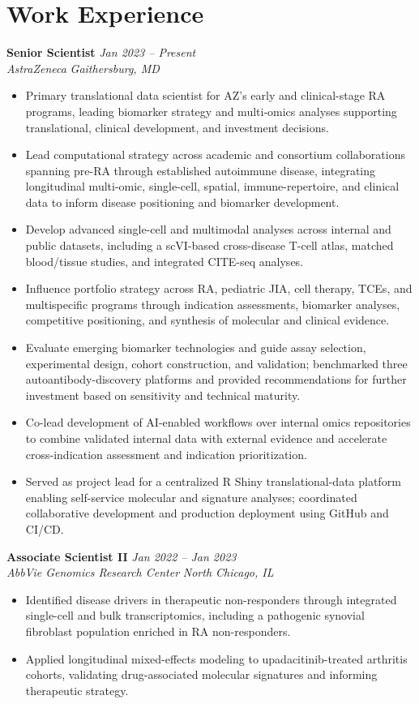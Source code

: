 \documentclass[letterpaper,11pt]{article}
\newcommand{\entry}[4]{%
    \textbf{#1} \hfill \textit{\color{graytext} #2} \\
    \textit{#3} \hfill \textit{\color{graytext} #4}\par
}
\begin{document}
\section*{Work Experience}
\entry{Senior Scientist}{Jan 2023 -- Present}{AstraZeneca}{Gaithersburg, MD}
\begin{itemize}
    \item Primary translational data scientist for AZ's early and clinical-stage RA programs, leading biomarker strategy and multi-omics analyses supporting translational, clinical development, and investment decisions.
    \item Lead computational strategy across academic and consortium collaborations spanning pre-RA through established autoimmune disease, integrating longitudinal multi-omic, single-cell, spatial, immune-repertoire, and clinical data to inform disease positioning and biomarker development.
    \item Develop advanced single-cell and multimodal analyses across internal and public datasets, including a scVI-based cross-disease T-cell atlas, matched blood/tissue studies, and integrated CITE-seq analyses.
    \item Influence portfolio strategy across RA, pediatric JIA, cell therapy, TCEs, and multispecific programs through indication assessments, biomarker analyses, competitive positioning, and synthesis of molecular and clinical evidence.
    \item Evaluate emerging biomarker technologies and guide assay selection, experimental design, cohort construction, and validation; benchmarked three autoantibody-discovery platforms and provided recommendations for further investment based on sensitivity and technical maturity.
    \item Co-lead development of AI-enabled workflows over internal omics repositories to combine validated internal data with external evidence and accelerate cross-indication assessment and indication prioritization.
    \item Served as project lead for a centralized R Shiny translational-data platform enabling self-service molecular and signature analyses; coordinated collaborative development and production deployment using GitHub and CI/CD.
\end{itemize}

\entry{Associate Scientist II}{Jan 2022 -- Jan 2023}{AbbVie Genomics Research Center}{North Chicago, IL}
\begin{itemize}
    \item Identified disease drivers in therapeutic non-responders through integrated single-cell and bulk transcriptomics, including a pathogenic synovial fibroblast population enriched in RA non-responders.
    \item Applied longitudinal mixed-effects modeling to upadacitinib-treated arthritis cohorts, validating drug-associated molecular signatures and informing therapeutic strategy.
\end{itemize}
\end{document}
